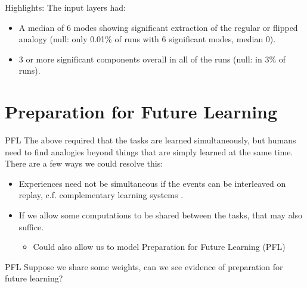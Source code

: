 \documentclass{beamer}
\begin{document}
\begin{frame}{Highlights:}
The input layers had:
\begin{itemize}
    \item<1-> A median of 6 modes showing significant extraction of the regular or flipped analogy (null: only 0.01\% of runs with 6 significant modes, median 0).
    \item<2-> 3 or more significant components overall in all of the runs (null: in 3\% of runs).
\end{itemize}
\end{frame}

\section{Preparation for Future Learning}
\begin{frame}{PFL}
The above required that the tasks are learned simultaneously, but humans need to find analogies beyond things that are simply learned at the same time. There are a few ways we could resolve this: 
\begin{itemize}
\item<2-> Experiences need not be simultaneous if the events can be interleaved on replay, c.f. complementary learning systems \cite{Kumaran2016}.
\item<3-> If we allow some computations to be shared between the tasks, that may also suffice.
\begin{itemize}
\item<4-> Could also allow us to model Preparation for Future Learning (PFL)
\end{itemize}
\end{itemize}
\end{frame}


\begin{frame}{PFL}
Suppose we share some weights, can we see evidence of preparation for future learning?\\[11pt]
\begin{columns}
\end{columns}
\end{frame}
\end{document}
